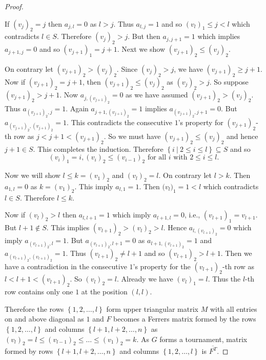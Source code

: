 \documentclass{article}
\theoremstyle{definition}
\numberwithin{equation}{section}
\newcommand{\set}[1]{\left\{#1\right\}}
\newcommand{\Set}[2]{\set{#1\ \vert\ #2}}
\begin{document}
\begin{proof}
\begin{itemize}
\vspace{0.25em}\noindent
If ${(v_{j})}_{2}=j$ then $a_{j,l}=0$ as $l>j$. Thus $a_{l,j}=1$ and so $(v_l)_1\leq j<l$ which contradicts $l\in S$. Therefore $(v_j)_2>j$. But then $a_{j,j+1}=1$ which implies $a_{j+1,j}=0$ and so $(v_{j+1})_1=j+1$. Next we show $(v_{j+1})_2\leq (v_j)_2$.

\vspace{0.25em}\noindent
On contrary let $(v_{j+1})_2>(v_j)_2$. Since $(v_j)_2>j$, we have $(v_{j+1})_2\geq j+1$. Now if ${(v_{j+1})}_{2}=j+1$, then ${(v_{j+1})}_{2}\leq (v_j)_2$ as $(v_j)_2>j$. So suppose ${(v_{j+1})}_{2}>j+1$. Now $a_{j,(v_{j+1})_2}=0$ as we have assumed $(v_{j+1})_2>(v_j)_2$. Thus $a_{(v_{j+1})_2,j}=1$. Again $a_{j+1,(v_{j+1})_2}=1$ implies $a_{(v_{j+1})_2,j+1}=0$. But $a_{(v_{j+1})_2,(v_{j+1})_2}=1$. This contradicts the consecutive $1$'s property for $(v_{j+1})_2$-th row as $j<j+1<(v_{j+1})_2$. So we must have $(v_{j+1})_2\leq (v_j)_2$ and hence $j+1\in S$. This completes the induction. Therefore $\Set{i}{2\leq i\leq l}\subseteq S$ and so 
$${(v_{i})}_{1}=i, {(v_{i})}_{2}\leq {(v_{i-1})}_{2}\text{ for all }i\text{ with }2\leq i\leq l.$$
\end{itemize}

\noindent
Now we will show $l\leq k=(v_1)_2$ and ${(v_{l})}_{2}=l$. On contrary let $l>k$. Then $a_{1,l}=0$ as $k=(v_1)_2$. This imply $a_{l,1}=1$. Then $({v_{l})}_{1}=1<l$ which contradicts $l\in S$. Therefore $l\leq k$. 

\vspace{0.5em}\noindent
Now if ${(v_{l})}_{2}>l$ then $a_{l,l+1}=1$ which imply $a_{l+1,l}=0$, i.e., ${(v_{l+1})}_{1}=v_{l+1}$. But $l+1\notin S$. This implies ${(v_{l+1})}_{2}>{(v_{l})}_{2}>l$. Hence $a_{l,(v_{l+1})_{2}}=0$ which imply $a_{(v_{l+1})_{2},l}=1$. But $a_{{(v_{l+1})}_{2},l+1}=0$ as $a_{l+1,(v_{l+1})_2}=1$ and $a_{{(v_{l+1})}_{2},{(v_{l+1})}_{2}}=1$. Thus $(v_{l+1})_2\neq l+1$ and so $(v_{l+1})_2>l+1$. Then we have a contradiction in the consecutive $1$'s property for the ${(v_{l+1})}_{2}$-th row as $l<l+1<(v_{l+1})_2$. So ${(v_{l})}_{2}=l$. Already we have ${(v_{l})}_{1}=l$. Thus the $l$-th row contains only one $1$ at the position $(l,l)$.

\vspace{0.5em}\noindent  
Therefore the rows $\set{1,2,\ldots,l}$ form upper triangular matrix $M$ with all entries on and above diagonal as $1$ and $F$ becomes a Ferrers matrix formed by the rows $\set{1,2,\ldots,l}$ and columns $\set{l+1,l+2,\ldots,n}$ as ${(v_{l})}_{2}=l\leq{(v_{l-1})}_{2}\leq \ldots \leq {(v_{1})}_{2}=k$. As $G$ forms a tournament, matrix formed by rows $\set{l+1,l+2,\ldots,n}$ and columns $\set{1,2,\ldots,l}$ is $\overline{F^{T}}$.


\end{proof}
\end{document}

